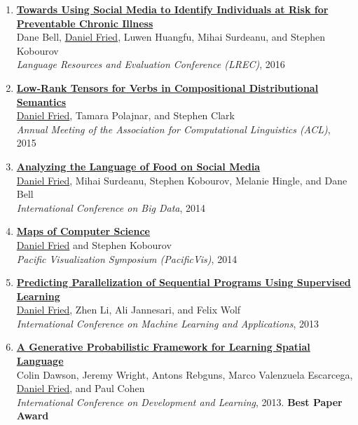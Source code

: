 \begin{enumerate}[leftmargin=-1mm,partopsep=0pt]
\item \href{http://arxiv.org/abs/1603.03784}{\textbf{Towards Using Social Media to Identify Individuals at Risk for Preventable Chronic Illness}} \\
  Dane Bell, \underline{Daniel Fried}, Luwen Huangfu, Mihai Surdeanu, and Stephen Kobourov\\
  \emph{Language Resources and Evaluation Conference (LREC)}, 2016

\item \href{https://people.eecs.berkeley.edu/~dfried/papers/FPC-verb_tensors.pdf}{\textbf{Low-Rank Tensors for Verbs in Compositional Distributional Semantics}} \\
  \underline{Daniel Fried}, Tamara Polajnar, and Stephen Clark\\
  \emph{Annual Meeting of the Association for Computational Linguistics (ACL)}, 2015

\item \href{https://people.eecs.berkeley.edu/~dfried/papers/Fried-bigdata2014.pdf}{\textbf{Analyzing the Language of Food on Social Media}} \\
  \underline{Daniel Fried}, Mihai Surdeanu, Stephen Kobourov, Melanie Hingle, and Dane Bell\\
  \emph{International Conference on Big Data}, 2014

\item \href{https://arxiv.org/abs/1304.2681}{\textbf{Maps of Computer Science}} \\
  \underline{Daniel Fried} and Stephen Kobourov\\
  \emph{Pacific Visualization Symposium (PacificVis)}, 2014

\item \href{https://people.eecs.berkeley.edu/~dfried/papers/Fried-ICMLA2013.pdf}{\textbf{Predicting Parallelization of Sequential Programs Using Supervised Learning}} \\
  \underline{Daniel Fried}, Zhen Li, Ali Jannesari, and Felix Wolf\\
  \emph{International Conference on Machine Learning and Applications}, 2013

\item \href{https://people.eecs.berkeley.edu/~dfried/papers/ICDL2013.pdf}{\textbf{A Generative Probabilistic Framework for Learning Spatial Language}} \\
  Colin Dawson, Jeremy Wright, Antons Rebguns, Marco Valenzuela Escarcega, \underline{Daniel Fried}, and Paul Cohen\\
  \emph{International Conference on Development and Learning}, 2013. \textbf{Best Paper Award}


\end{enumerate}
